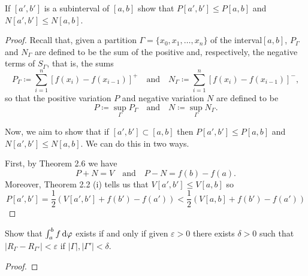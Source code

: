 \begin{problem}
  If $[a',b']$ is a subinterval of $[a,b]$ show that $P[a',b']\leq P[a,b]$
  and $N[a',b']\leq N[a,b]$.
\end{problem}
\begin{proof}
  Recall that, given a partition $\Gamma=\{x_0,x_1,\dotsc,x_n\}$ of the
  interval$[a,b]$, $P_\Gamma$ and $N_\Gamma$ are defined to be the sum of
  the positive and, respectively, the negative terms of $S_\Gamma$, that
  is, the sums
  \[
    P_\Gamma\coloneq\sum_{i=1}^n\left[f(x_i)-f(x_{i-1})\right]^+
    \quad\text{and}\quad
    N_\Gamma\coloneq\sum_{i=1}^n\left[f(x_i)-f(x_{i-1})\right]^-,
  \]
  so that the positive variation $P$ and negative variation $N$ are defined
  to be
  \[
    P\coloneq\sup_\Gamma P_\Gamma \quad\text{and}\quad N\coloneq\sup_\Gamma
    N_\Gamma.
  \]

  Now, we aim to show that if $[a',b']\subset[a,b]$ then
  $P[a',b']\leq P[a,b]$ and $N[a',b']\leq N[a,b]$. We can do this in two
  ways.

  First, by Theorem 2.6 we have
  \[
    P+N=V\quad\text{and}\quad P-N=f(b)-f(a).
  \]
  Moreover, Theorem 2.2 (i) tells us that $V[a',b']\leq V[a,b]$ so
  \[
    P[a',b']=\frac{1}{2}(V[a',b']+f(b')-f(a'))<\frac{1}{2}(V[a,b]+f(b')-f(a'))
  \]
\end{proof}

\begin{problem}
  Show that $\int_a^bf\mathop{}\!\mathrm{d}\varphi$ exists if and only if given
  $\varepsilon>0$ there exists $\delta>0$ such that
  $\left|R_\Gamma-R_{\Gamma'}\right|<\varepsilon$ if
  $|\Gamma|,|\Gamma'|<\delta$.
\end{problem}
\begin{proof}
\end{proof}


